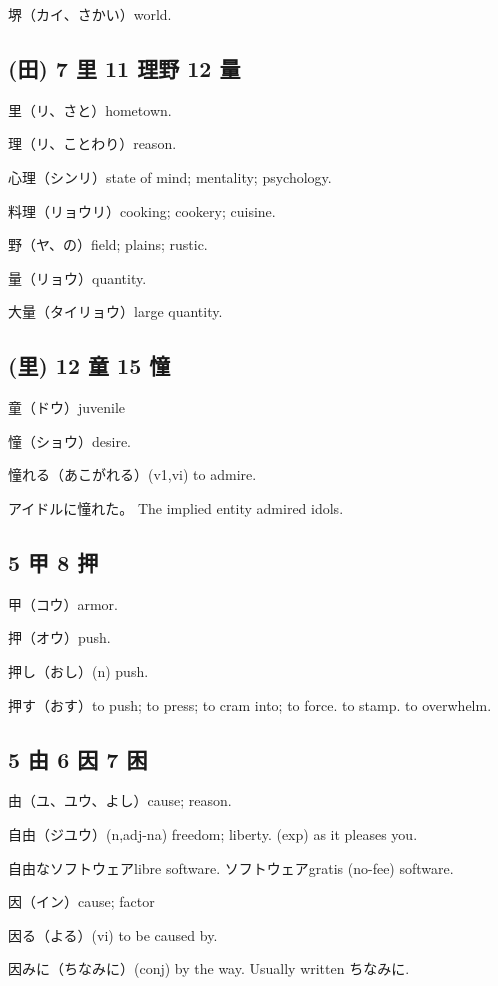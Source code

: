 堺（カイ、さかい）world.

\subsection{(田) 7 里 11 理野 12 量}

里（リ、さと）hometown.

理（リ、ことわり）reason.

心理（シンリ）state of mind; mentality; psychology.

料理（リョウリ）cooking; cookery; cuisine.

野（ヤ、の）field; plains; rustic.

量（リョウ）quantity.

大量（タイリョウ）large quantity.

\subsection{(里) 12 童 15 憧}

童（ドウ）juvenile

憧（ショウ）desire.

憧れる（あこがれる）(v1,vi) to admire.

アイドルに憧れた。
The implied entity admired idols.

\subsection{5 甲 8 押}

甲（コウ）armor.

押（オウ）push.

押し（おし）(n) push.

押す（おす）to push; to press; to cram into; to force.
to stamp.
to overwhelm.

\subsection{5 由 6 因 7 困}

由（ユ、ユウ、よし）cause; reason.

自由（ジユウ）(n,adj-na) freedom; liberty.
(exp) as it pleases you.

自由なソフトウェアlibre software.
ソフトウェアgratis (no-fee) software.

因（イン）cause; factor

因る（よる）(vi) to be caused by.

因みに（ちなみに）(conj) by the way.
Usually written ちなみに.

